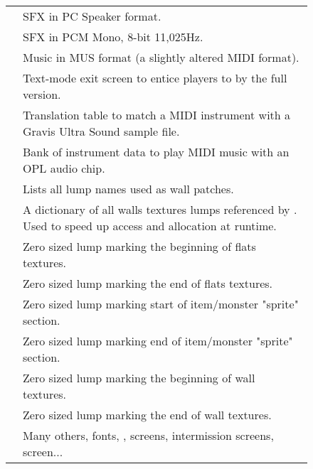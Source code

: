 \begin{figure}[H]
\begin{tabularx}{\textwidth}{ L{0.2}  L{0.8}}
  \toprule
   &  SFX in PC Speaker format.\\
   &  SFX in PCM Mono, 8-bit 11,025Hz.\\
   & Music in MUS format (a slightly altered MIDI format).\\
  \toprule
   & Text-mode exit screen to entice players to by the full version. \\
   & Translation table to match a MIDI instrument with a Gravis Ultra Sound sample file.\\
   &  Bank of instrument data to play MIDI music with an OPL audio chip.\\
   &  Lists all lump names used as wall patches.\\
   &  A dictionary of all walls textures lumps referenced by . Used to speed up access and allocation at runtime.\\  
   &  Zero sized lump marking the beginning of flats textures.\\  
   &   Zero sized lump marking the end of flats textures.\\  
   & Zero sized lump marking start of item/monster "sprite" section. \\  
   & Zero sized lump marking end of item/monster "sprite" section. \\  
   & Zero sized lump marking the beginning of wall textures.\\
   & Zero sized lump marking the end of wall textures.\\
   &  Many others, fonts, ,  screens, intermission screens,  screen... \\  
   \toprule
\end{tabularx}
\end{figure}
\par
\pagebreak







